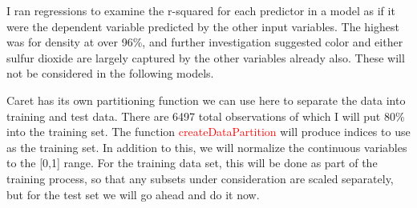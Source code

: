\documentclass[english,nohyper,titlepage]{tufte-handout}\usepackage{knitr}
\begin{document}
I ran regressions to examine the r-squared for each predictor in a model as if it were the dependent variable predicted by the other input variables.  The highest was for density at over 96\%, and further investigation suggested color and either sulfur dioxide are largely captured by the other variables already also.  These will not be considered in the following models.

Caret has its own partitioning function we can use here to separate the data into training and test data.  There are 6497 total observations of which I will put 80\% into the training set.  The function \textcolor{red}{createDataPartition} will produce indices to use as the training set.  In addition to this, we will normalize the continuous variables to the [0,1] range.  For the training data set, this will be done as part of the training process, so that any subsets under consideration are scaled separately, but for the test set we will go ahead and do it now.

\begin{knitrout}\footnotesize
{}\color{fgcolor}
\end{knitrout}
\end{document}
